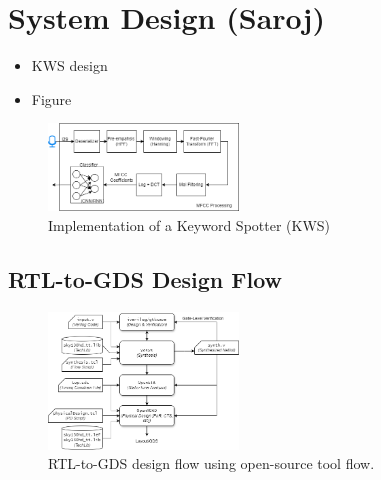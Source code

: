 \section{System Design (Saroj)}
\label{sec:system_design}
\begin{itemize}
    \item KWS design
    \item Figure
\end{itemize}

\begin{figure}[htbp]	
    \includegraphics[width=0.45\textwidth]{figs/KWS-architecture.png}
    \caption{Implementation of a Keyword Spotter (KWS)}
    \label{fig:KWS_Arch}
\end{figure}

\subsection{RTL-to-GDS Design Flow}

\begin{figure}[htbp]
	\includegraphics[width=0.45\textwidth]{figs/rtl2gds-toolchain.png}
	\caption{RTL-to-GDS design flow using open-source tool flow.}
	\label{fig:RTL-to-GDS}
\end{figure}

